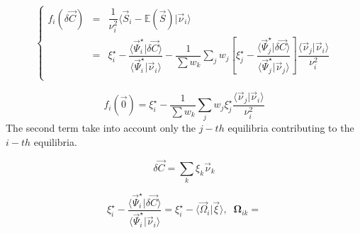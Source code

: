 \documentclass[aps,12pt]{revtex4}
\begin{document}
\begin{equation}
\left\lbrace
\begin{array}{rcl}
	f_i(\delta\vec{C}) &=& \dfrac{1}{\nu_i^2} \langle \vec{S}_i - \mathbb{E}(\vec{S}) \vert \vec{\nu}_i \rangle\\
	 & = &
	 \displaystyle \xi_i^\star - \dfrac{\langle \vec{\Psi}_i^\star \vert \delta\vec{C} \rangle}{\langle \vec{\Psi}_i^\star \vert \vec{\nu}_i \rangle
}
-
\dfrac{1}{\sum w_k}\sum_j w_j\left[ \xi_j^\star - \dfrac{\langle \vec{\Psi}_j^\star \vert \delta\vec{C} \rangle}{\langle \vec{\Psi}_j^\star \vert \vec{\nu}_j \rangle
}\right] \dfrac{\langle\vec{\nu}_j\vert\vec{\nu}_i\rangle}{\nu_i^2}\\
\end{array}
\right.
\end{equation} 

\begin{equation}
	f_i(\vec{0}) = \xi_i^\star - \dfrac{1}{\sum w_k}\sum_j w_j  \xi_j^\star \dfrac{\langle\vec{\nu}_j\vert\vec{\nu}_i\rangle}{\nu_i^2}
\end{equation}
The second term take into account only the $j-th$ equilibria contributing to the $i-th$ equilibria.

\begin{equation}
\delta\vec{C} = \sum_k \xi_k \vec{\nu}_k
\end{equation}

\begin{equation}
\xi_i^\star - \dfrac{\langle \vec{\Psi}_i^\star \vert \delta\vec{C} \rangle}{\langle \vec{\Psi}_i^\star \vert \vec{\nu}_i \rangle}
= \xi_i^\star - \langle\vec{\Omega}_i \vert \vec{\xi}\rangle,
\;\; \bm{\Omega}_{ik} = 
\end{equation}
\end{document}
